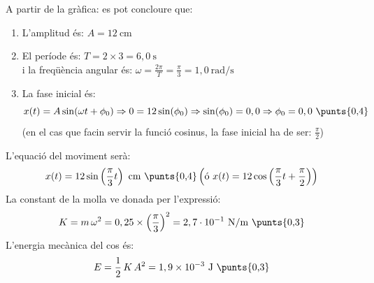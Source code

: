 \begin{solapartat}
A partir de la gràfica:
es pot concloure que:
\begin{enumerate}[label=\arabic*-]
\item L'amplitud és: $A = 12\ \mathrm{cm}$ 
\item El període és: $T = 2\times 3 = 6,0\ \mathrm{s}$ \\
i la freqüència angular és: $\omega = \frac{2\pi}{T} = \frac{\pi}{3} = 1,0\ \mathrm{rad/s}$ 
\item La fase inicial és:
\[ x(t) = A\sin(\omega t + \phi_0) \Rightarrow 0 = 12\sin(\phi_0) \Rightarrow \sin(\phi_0) = 0,0 \Rightarrow \phi_0 = 0,0 \ \text{\punts{0,4}} \]
(en el cas que facin servir la funció cosinus, la fase inicial ha de ser: $\frac{\pi}{2}$)
\end{enumerate}
\end{solapartat}

\begin{solapartat}
L'equació del moviment serà:
\[ x(t) = 12\sin\left(\frac{\pi}{3}t\right)\ \mathrm{cm} \ \text{\punts{0,4}} \left(\text{ó } x(t) = 12\cos\left(\frac{\pi}{3}t + \frac{\pi}{2}\right)\right) \]
La constant de la molla ve donada per l'expressió:
\[ K = m\,\omega^2 = 0,25\times\left(\frac{\pi}{3}\right)^2 = 2,7\cdot 10^{-1}\ \mathrm{N/m} \ \text{\punts{0,3}} \]
L'energia mecànica del cos és:
\[ E = \frac{1}{2}\,K\,A^2 = 1,9\times 10^{-3}\ \mathrm{J} \ \text{\punts{0,3}} \]
\end{solapartat}
